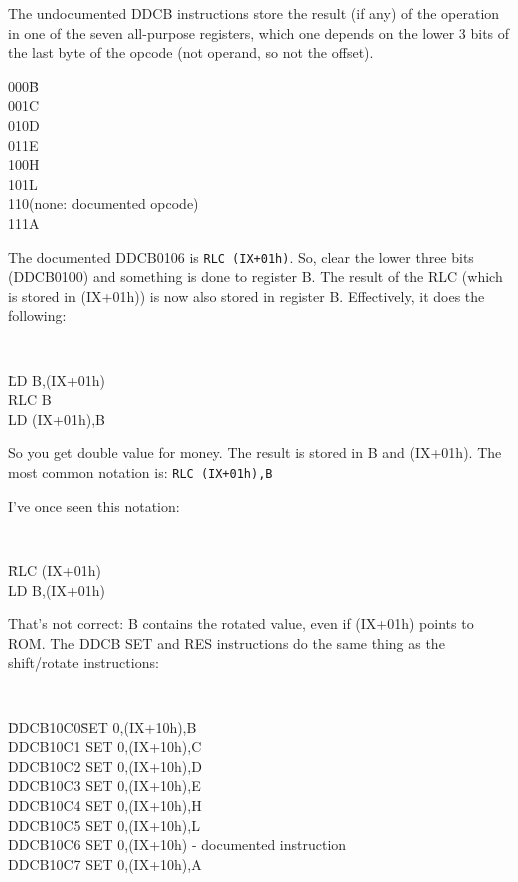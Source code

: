 \documentclass[oneside,a4paper]{book}
\begin{document}
The undocumented DDCB instructions store the result (if any) of the 
operation in one of the seven all-purpose registers, which one depends on
the lower 3 bits of the last byte of the opcode (not operand, so not
the offset).

\begin{tabbing}
{\qquad}000\quad\=B\\
{\qquad}001\>C\\
{\qquad}010\>D\\
{\qquad}011\>E\\
{\qquad}100\>H\\
{\qquad}101\>L\\
{\qquad}110\>(none: documented opcode)\\
{\qquad}111\>A
\end{tabbing}

The documented DDCB0106 is {\tt RLC (IX+01h)}. So, clear the lower three bits 
(DDCB0100) and something is done to register B. The result of the RLC
(which is stored in (IX+01h)) is now also stored in register B. Effectively,
it does the following:

{\tt
\begin{tabbing}
{\qquad}\=LD B,(IX+01h)\+\\
RLC B\\
LD (IX+01h),B
\end{tabbing}
}

So you get double value for money. The result is stored in B and (IX+01h). The
most common notation is: {\tt RLC (IX+01h),B}

I've once seen this notation:
 
{\tt
  \begin{tabbing}
    {\qquad}\=RLC (IX+01h)\+\\
    LD B,(IX+01h)
  \end{tabbing}
}

That's not correct: B contains the rotated value, even if (IX+01h) points to 
ROM. The DDCB SET and RES instructions do the same thing as the shift/rotate
instructions:

{\tt 
\begin{tabbing}
{\qquad}\=DDCB10C0{\qquad}\=SET 0,(IX+10h),B\+\\
DDCB10C1	\>SET 0,(IX+10h),C\\
DDCB10C2	\>SET 0,(IX+10h),D\\
DDCB10C3	\>SET 0,(IX+10h),E\\
DDCB10C4	\>SET 0,(IX+10h),H\\
DDCB10C5	\>SET 0,(IX+10h),L\\
DDCB10C6	\>SET 0,(IX+10h) {\rm - documented instruction}\\
DDCB10C7	\>SET 0,(IX+10h),A
\end{tabbing}
}
\end{document}
